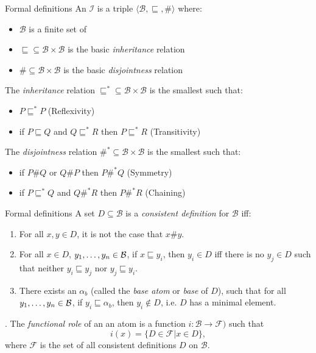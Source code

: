\documentclass{beamer}
\begin{document}
\begin{frame}{Formal definitions}
 An  $\mathcal{I}$ is a triple $\langle\mathcal{B},\sqsubseteq,\#\rangle$ where:
\begin{itemize}
\item $\mathcal{B}$ is a finite set of 
\item $\sqsubseteq\subseteq\mathcal{B}\times\mathcal{B}$ is the basic \emph{inheritance} relation
\item $\#\subseteq\mathcal{B}\times\mathcal{B}$ is the basic \emph{disjointness} relation
\end{itemize}
\par\vspace{5mm}
 The \emph{inheritance} relation $\sqsubseteq^*\subseteq\mathcal{B}\times\mathcal{B}$ is the smallest such that:
\begin{itemize}
\item $P\sqsubseteq^*P$  (Reflexivity)
\item if $P\sqsubseteq Q$ and $Q\sqsubseteq^*R$ then $P\sqsubseteq^*R$ (Transitivity)
\end{itemize}
The \emph{disjointness} relation $\#^*\subseteq\mathcal{B}\times\mathcal{B}$ is the smallest such that:
\begin{itemize}
\item if $P\#Q$ or $Q\#P$ then $P\#^*Q$ (Symmetry)
\item if $P\sqsubseteq^*Q$ and $Q\#^*R$ then $P\#^*R$ (Chaining)
\end{itemize}
\end{frame}

\begin{frame}{Formal definitions}
 A set $D\subseteq\mathcal{B}$ is a \emph{consistent definition} for $\mathcal{B}$ iff:
\begin{enumerate}
\item For all $x,y\in D$, it is not the case that $x\#y$.
\item For all $x\in D$, $y_1,\mathellipsis,y_n\in\mathcal{B}$, if $x\sqsubseteq y_i$, then $y_i\in D$ iff there is no $y_j\in D$ such that neither $y_i\sqsubseteq y_j$ nor $y_j\sqsubseteq y_i$.
\item There exists an $\alpha_b$ (called the \emph{base atom} or \emph{base} of $D$), such that for all $y_1,\mathellipsis,y_n\in\mathcal{B}$, if $y_i\sqsubseteq \alpha_b$, then $y_i\notin D$, i.e. $D$ has a minimal element.
\end{enumerate}
\par\vspace{5mm}
. The \emph{functional role} of an an atom is a function $i:\mathcal{B}\rightarrow\mathcal{F})$ such that
$$i(x)=\{D\in\mathcal{F}\vert x\in D\},$$
where $\mathcal{F}$ is the set of all consistent definitions $D$ on $\mathcal{B}$.
\end{frame}
\end{document}
